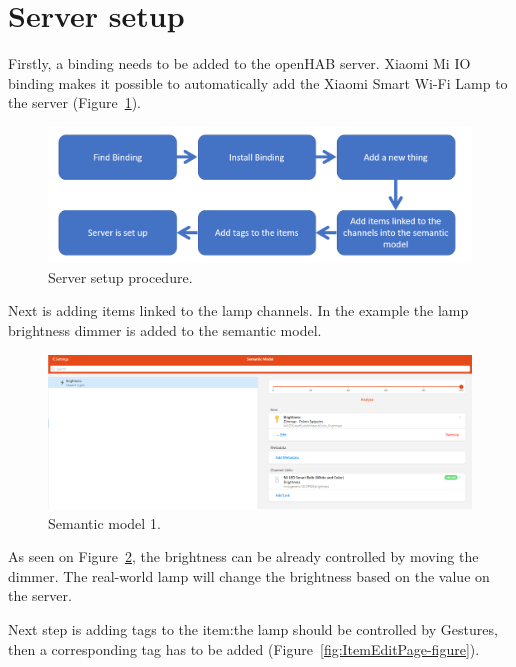 \section{Server setup}
Firstly, a binding needs to be added to the openHAB server. Xiaomi Mi IO binding makes it possible to automatically add the Xiaomi Smart Wi-Fi Lamp to the server (Figure~\ref{fig:ServerSetupProcedure-figure}).

\begin{figure}
  \centering
  \includegraphics[width = 0.9 \linewidth]{figures/ServerSetupProcedure.png}
  \caption{Server setup procedure.}
  \label{fig:ServerSetupProcedure-figure}
\end{figure}

Next is adding items linked to the lamp channels. In the example the lamp brightness dimmer is added to the semantic model.

\begin{figure}
  \centering
  \includegraphics[width = 0.9 \linewidth]{figures/SemanticModelOne.png}
  \caption{Semantic model 1.}
  \label{fig:SemanticModelOne-figure}
\end{figure}

As seen on Figure~\ref{fig:SemanticModelOne-figure}, the brightness can be already controlled by moving the dimmer. The real-world lamp will change the brightness based on the value on the server.

Next step is adding tags to the item:the lamp should be controlled by Gestures, then a corresponding tag has to be added (Figure~\ref{fig:ItemEditPage-figure}).

